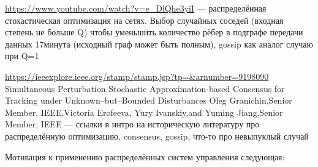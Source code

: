 \documentclass{report}
\begin{document}
\url{https://www.youtube.com/watch?v=e_DlQhe3yiI}
--- распределённая стохастическая оптимизация на сетях.
Выбор случайных соседей (входная степень не больше Q) чтобы уменьшить количество рёбер в подграфе передачи данных 17минута (исходный граф может быть полным), gossip как аналог случаю при Q=1

\url{https://ieeexplore.ieee.org/stamp/stamp.jsp?tp=&arnumber=9198090} Simultaneous Perturbation Stochastic Approximation-based Consensus for Tracking under Unknown–but–Bounded Disturbances Oleg Granichin,Senior Member, IEEE,Victoria Erofeeva, Yury Ivanskiy,and Yuming Jiang,Senior Member, IEEE --- ссылки в интро на историческую литературу про распределённую оптимизацию, consensus, gossip, что-то про невыпуклый случай

Мотивация к применению распределённых систем управления следующая:
\end{document}
